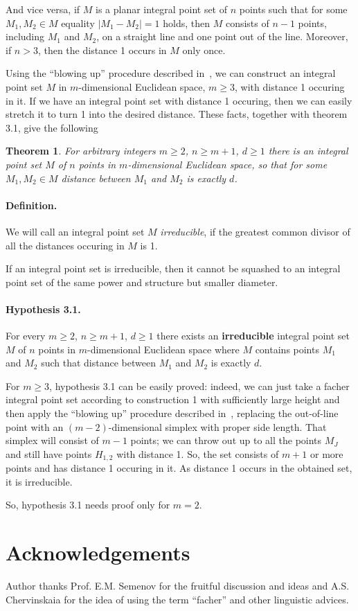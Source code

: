 \documentclass[a4paper,14pt]{article} %
\theoremstyle{plain}
\newtheorem{theorem}{Theorem}[section]
\begin{document}
And vice versa, if $M$ is a planar integral point set of $n$ points
such that for some $M_1,M_2 \in M$ equality $|M_1 - M_2|=1$ holds,
then $M$ consists of $n-1$ points, including $M_1$ and $M_2$, on a straight line and one point out of the line.
Moreover, if $n > 3$, then the distance 1 occurs in $M$ only once.

Using the ``blowing up'' procedure described in~\cite[theorem 1.3]{kurz2008bounds},
we can construct an integral point set $M$ in $m$-dimensional Euclidean space, $m\geq 3$,
with distance 1 occuring in it.
If we have an integral point set with distance 1 occuring,
then we can easily stretch it to turn 1 into the desired distance.
These facts, together with theorem 3.1, give the following

\begin{theorem}
	For arbitrary integers $m \geq 2$, $n \geq m+1$, $d \geq 1$
	there is an integral point set $M$ of $n$ points in $m$-dimensional Euclidean space,
	so that for some $M_1, M_2\in M$ distance between $M_1$ and $M_2$ is exactly $d$.
\end{theorem}

\paragraph{Definition.}
We will call an integral point set $M$ \textit{irreducible}, if the greatest common divisor
of all the distances occuring in $M$ is 1.

If an integral point set is irreducible,
then it cannot be squashed to an integral point set of the same power and structure but smaller diameter.

\paragraph{Hypothesis 3.1.}
For every $m \geq 2$, $n \geq m+1$, $d \geq 1$ there exists an \textbf{irreducible}
integral point set $M$ of $n$ points in $m$-dimensional Euclidean space
where $M$ contains points $M_1$ and $M_2$ such that distance between $M_1$ and $M_2$ is exactly $d$.

For $m \geq 3$, hypothesis 3.1 can be easily proved:
indeed, we can just take a facher integral point set according to construction 1
with sufficiently large height and then apply the ``blowing up'' procedure described in~\cite[theorem 1.3]{kurz2008bounds},
replacing the out-of-line point with an $(m-2)$-dimensional simplex with proper side length.
That simplex will consist of $m-1$ points;
we can throw out up to all the points $M_J$ and still have points $H_{1,2}$ with distance 1.
So, the set consists of $m+1$ or more points and has distance 1 occuring in it.
As distance 1 occurs in the obtained set, it is irreducible.

So, hypothesis 3.1 needs proof only for $m=2$.

\section{Acknowledgements}
Author thanks Prof. E.M. Semenov for the fruitful discussion and ideas
and A.S. Chervinskaia for the idea of using the term ``facher'' and other linguistic advices.


\printbibliography
\end{document}
